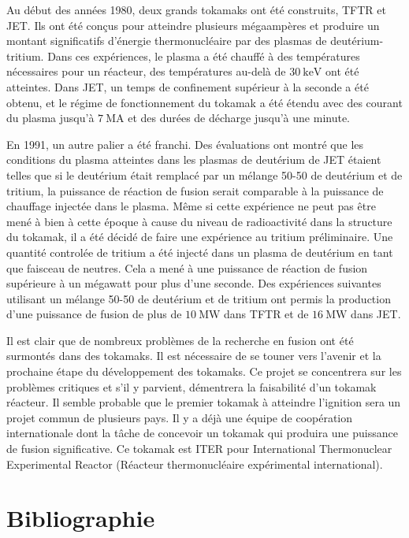 \documentclass[main.tex]{subfiles}
\begin{document}
Au début des années 1980, deux grands tokamaks ont été construits, TFTR et JET.
Ils ont été conçus pour atteindre plusieurs mégaampères et produire un montant significatifs d'énergie thermonucléaire par des plasmas de deutérium-tritium.
Dans ces expériences, le plasma a été chauffé à des températures nécessaires pour un réacteur, des températures au-delà de \( \SI{30}{\kilo\electronvolt} \) ont été atteintes.
Dans JET, un temps de confinement supérieur à la seconde a été obtenu, et le régime de fonctionnement du tokamak a été étendu avec des courant du plasma jusqu'à \( \SI{7}{\mega\ampere} \) et des durées de décharge jusqu'à une minute.

En 1991, un autre palier a été franchi.
Des évaluations ont montré que les conditions du plasma atteintes dans les plasmas de deutérium de JET étaient telles que si le deutérium était remplacé par un mélange 50-50 de deutérium et de tritium, la puissance de réaction de fusion serait comparable à la puissance de chauffage injectée dans le plasma.
Même si cette expérience ne peut pas être mené à bien à cette époque à cause du niveau de radioactivité dans la structure du tokamak, il a été décidé de faire une expérience au tritium  préliminaire.
Une quantité controlée de tritium a été injecté dans un plasma de deutérium en tant que faisceau de neutres.
Cela a mené à une puissance de réaction de fusion supérieure à un mégawatt pour plus d'une seconde.
Des expériences suivantes utilisant un mélange 50-50 de deutérium et de tritium ont permis la production d'une puissance de fusion de plus de \( \SI{10}{\mega\watt} \) dans TFTR et de \( \SI{16}{\mega\watt} \) dans JET.

Il est clair que de nombreux problèmes de la recherche en fusion ont été surmontés dans des tokamaks.
Il est nécessaire de se touner vers l'avenir et la prochaine étape du développement des tokamaks.
Ce projet se concentrera sur les problèmes critiques et s'il y parvient, démentrera la faisabilité d'un tokamak réacteur.
Il semble probable que le premier tokamak à atteindre l'ignition sera un projet commun de plusieurs pays.
Il y a déjà une équipe de coopération internationale dont la tâche de concevoir un tokamak qui produira une puissance de fusion significative. Ce tokamak est ITER pour International Thermonuclear Experimental Reactor (Réacteur thermonucléaire expérimental international).

\clearpage
\twocolumn
\section*{Bibliographie}
\end{document}

